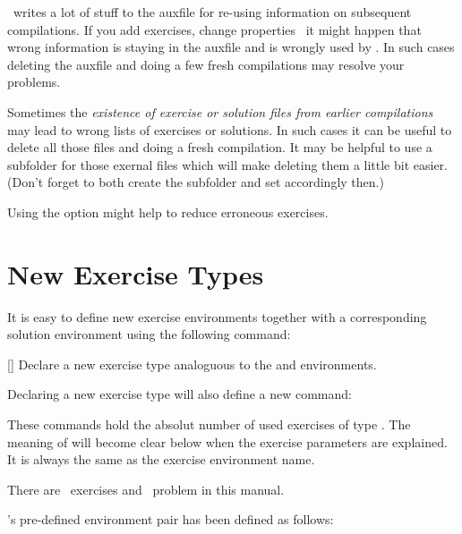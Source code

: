 \documentclass{xsim-manual}
\begin{document}
\begin{bewareofthedog}
  \xsim\ writes a lot of stuff to the auxfile for re-using information on
  subsequent compilations.  If you add exercises, change properties \etc\ it
  might happen that wrong information is staying in the auxfile and is wrongly
  used by \xsim.  In such cases deleting the auxfile and doing a few fresh
  compilations may resolve your problems.

  Sometimes the \emph{existence of exercise or solution files from earlier
    compilations} may lead to wrong lists of exercises or solutions.  In such
  cases it can be useful to delete all those files and doing a fresh
  compilation.  It may be helpful to use a subfolder for those exernal files
  which will make deleting them a little bit easier. (Don't forget to both
  create the subfolder and set  accordingly then.)

  Using the  option might help to reduce erroneous exercises.
\end{bewareofthedog}

\section{New Exercise Types}\label{sec:new-exercise-types}

It is easy to define new exercise environments together with a corresponding
solution environment using the following command:
\begin{commands}
  []
    Declare a new exercise type analoguous to the  and
     environments.
\end{commands}

Declaring a new exercise type will also define a new command:
\begin{commands}
    These commands hold the absolut number of used exercises of type
    .  The meaning of  will become clear below
    when the exercise parameters are explained.  It is always the same as the
    exercise environment name.
\end{commands}
\begin{example}
  There are \numberofexercises~exercises and \numberofproblems~problem in this
  manual.
\end{example}
\xsim's pre-defined environment pair has been defined as follows:
\begin{sourcecode}
\end{sourcecode}
\end{document}
